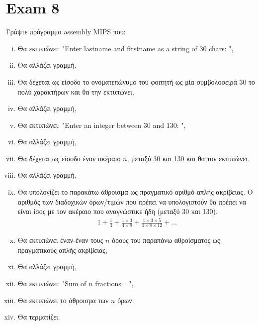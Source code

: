 \documentclass{article}
\begin{document}
\section*{Exam 8}
Γράψτε πρόγραμμα assembly MIPS που:
\begin{enumerate}[i.]
    \itemsep0em
    \item Θα εκτυπώνει: "Enter lastname and firstname as a string of $30$ chars: ",
    \item Θα αλλάζει γραμμή,
    \item Θα δέχεται ως είσοδο το ονοματεπώνυμο του φοιτητή ως μία συμβολοσειρά $30$ το πολύ χαρακτήρων και θα την εκτυπώνει,
    \item Θα αλλάζει γραμμή,
    \item Θα εκτυπώνει: "Enter an integer between 30 and 130: ",
    \item Θα αλλάζει γραμμή,
    \item Θα δέχεται ως είσοδο έναν ακέραιο $n$, μεταξύ 30 και 130 και θα τον εκτυπώνει.
    \item Θα αλλάζει γραμμή,
    \item Θα υπολογίζει το παρακάτω άθροισμα ως πραγματικό αριθμό απλής ακρίβειας. Ο
    αριθμός των διαδοχικών όρων/τιμών που πρέπει να υπολογιστούν θα πρέπει να είναι ίσος
    με τον ακέραιο που αναγνώστικε ήδη (μεταξύ 30 και 130).
    \begin{align}
        1+\frac{1}{4}+\frac{1\times3}{4\times8}
        +\frac{1\times3\times5}{4\times8\times12}+\hdots\nonumber
    \end{align}
    \item Θα εκτυπώνει έναν-έναν τους $n$ όρους του παραπάνω αθροίσματος ως πραγματικούς απλής ακρίβειας,
    \item Θα αλλάζει γραμμή,
    \item Θα εκτυπώνει: "Sum of $n$ fractions= ",
    \item Θα εκτυπώνει το άθροισμα των $n$ όρων.
    \item Θα τερματίζει.
\end{enumerate}
\end{document}
